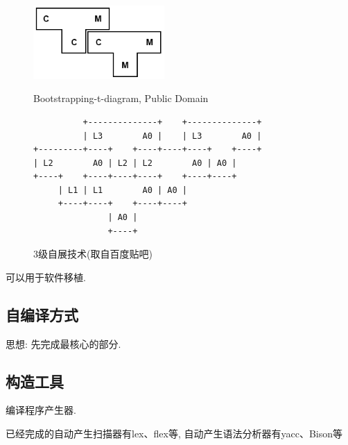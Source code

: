         \begin{figure}[h]\centering
            \begin{minipage}{0.5\linewidth} \centering
                \includegraphics[width=5cm]{compile_chaps/lect2_inc/Bootstrapping-t-diagram.png}
                \caption{Bootstrapping-t-diagram, Public Domain}
                \label{fig:2:bootstrapping}
            \end{minipage}
            \begin{minipage}{0.45\linewidth}
                {\small
\begin{verbatim}          +--------------+    +--------------+
          | L3        A0 |    | L3        A0 |
+---------+----+    +----+----+----+    +----+
| L2        A0 | L2 | L2        A0 | A0 |
+----+    +----+----+----+    +----+----+
     | L1 | L1        A0 | A0 |
     +----+----+    +----+----+
               | A0 |
               +----+\end{verbatim}}
                \caption{3级自展技术(取自百度贴吧)}
                \label{fig:2:3-self-extract}
            \end{minipage}
        \end{figure}


        可以用于软件移植.

    \subsection{自编译方式}

        思想: 先完成最核心的部分.

    \subsection{构造工具}

        编译程序产生器.

        已经完成的自动产生扫描器有lex、flex等, 自动产生语法分析器有yacc、Bison等

